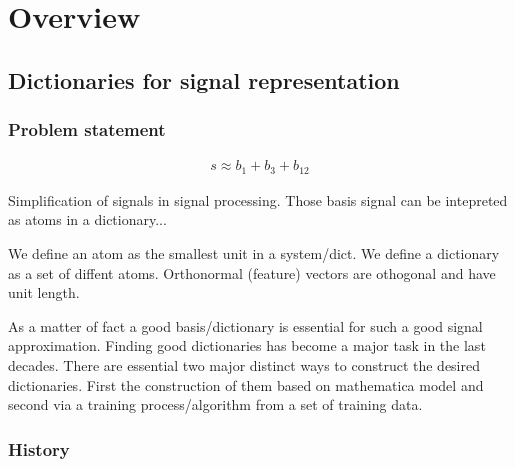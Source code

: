 \chapter{Overview}
\thispagestyle{empty}

\section{Dictionaries for signal representation}
\subsection{Problem statement}

\begin{align*}
s \approx b_1+b_3+b_{12}
\end{align*}


Simplification of signals in signal processing.
Those basis signal can be intepreted as atoms in a dictionary...

We define an atom as the smallest unit in a system/dict.
We define a dictionary as a set of diffent atoms.
Orthonormal (feature) vectors are othogonal and have unit length.


As a matter of fact a good basis/dictionary is essential for such a good signal approximation. \cite{} 
Finding good dictionaries has become a major task in the last decades.
There are essential two major distinct ways to construct the desired dictionaries. First the construction of them based on mathematica model and second
via a training process/algorithm from a set of training data.





\subsection{History}

